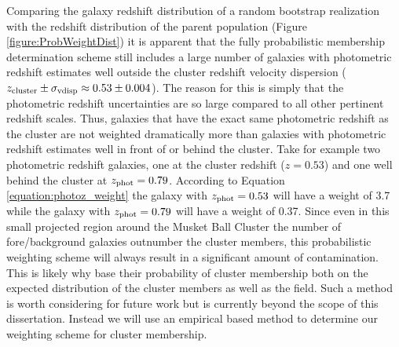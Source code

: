 Comparing the galaxy redshift distribution of a random bootstrap realization with the redshift distribution of the parent population (Figure \ref{figure:ProbWeightDist}) it is apparent that the fully probabilistic membership determination scheme still includes a large number of galaxies with photometric redshift estimates well outside the cluster redshift velocity dispersion ($z_{\rm cluster}\pm\sigma_{\rm vdisp} \approx 0.53\pm0.004$).
The reason for this is simply that the photometric redshift uncertainties are so large compared to all other pertinent redshift scales.
Thus, galaxies that have the exact same photometric redshift as the cluster are not weighted dramatically more than galaxies with photometric redshift estimates well in front of or behind the cluster.
Take for example two photometric redshift galaxies, one at the cluster redshift ($z=0.53$) and one well behind the cluster at $z_{\rm phot}=0.79$.
According to Equation \ref{equation:photoz_weight} the galaxy with $z_{\rm phot}=0.53$ will have a weight of 3.7 while the galaxy with $z_{\rm phot}=0.79$ will have a weight of 0.37.
Since even in this small projected region around the Musket Ball Cluster the number of fore/background galaxies outnumber the cluster members, this probabilistic weighting scheme will always result in a significant amount of contamination.
This is likely why \citet{George:2011kv} base their probability of cluster membership both on the expected distribution of the cluster members as well as the field.
Such a method is worth considering for future work but is currently beyond the scope of this dissertation.
Instead we will use an empirical based method to determine our weighting scheme for cluster membership. 


